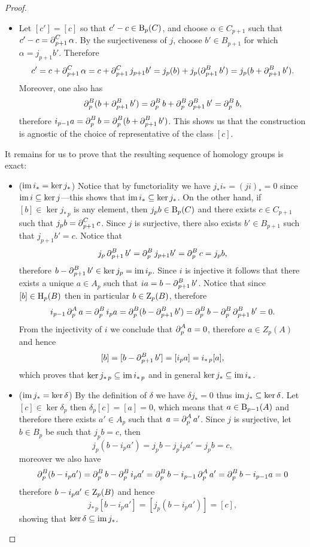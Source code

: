 \begin{proof}
\begin{itemize}
\item Let \([c'] = [c]\) so that \(c' - c \in \operatorname{B}_p(C)\), and choose
  \(\alpha \in C_{p+1}\) such that \(c' - c = \operatorname{\partial}_{p+1}^C \alpha\). By the surjectiveness
  of \(j\), choose \(b' \in B_{p+1}\) for which \(\alpha = j_{p+1} b'\). Therefore
  \[
  c' = c + \operatorname{\partial}_{p+1}^C \alpha = c + \operatorname{\partial}_{p+1}^C j_{p+1} b'
  = j_p(b) + j_p(\operatorname{\partial}_{p+1}^B b')
  = j_p(b + \operatorname{\partial}_{p+1}^B b').
  \]
  Moreover, one also has
  \[
  \operatorname{\partial}_p^B(b + \operatorname{\partial}_{p+1}^B b')
  = \operatorname{\partial}_p^B b + \operatorname{\partial}_p^B \operatorname{\partial}_{p+1}^B b'
  = \operatorname{\partial}_p^{B} b,
  \]
  therefore \(i_{p-1} a = \operatorname{\partial}_p^B b = \operatorname{\partial}_p^B(b + \operatorname{\partial}_{p+1}^B b')\).  This
  shows us that the construction is agnostic of the choice of representative of
  the class \([c]\).
\end{itemize}
It remains for us to prove that the resulting sequence of homology groups is
exact:
\begin{itemize}\setlength\itemsep{0em}
\item (\(\operatorname{im} i_{*} = \ker j_{*}\)) Notice that by functoriality we have
  \(j_{*} i_{*} = (j i)_{*} = 0\) since \(\operatorname{im} i \subseteq \ker j\)---this shows that
  \(\operatorname{im} i_{*} \subseteq \ker j_{*}\). On the other hand, if
  \([b] \in \ker j_{*\, p}\) is any element, then \(j_p b \in \operatorname{B}_p(C)\) and there
  exists \(c \in C_{p+1}\) such that \(j_p b = \operatorname{\partial}_{p+1}^C c\). Since \(j\) is
  surjective, there also exists \(b' \in B_{p+1}\) such that \(j_{p+1} b' =
  c\). Notice that
  \[
  j_p\operatorname{\partial}_{p+1}^B b' = \operatorname{\partial}_p^B j_{p+1} b' = \operatorname{\partial}_p^B c = j_p b,
  \]
  therefore \(b - \operatorname{\partial}_{p+1}^B b' \in \ker j_p = \operatorname{im} i_p\). Since \(i\) is
  injective it follows that there exists a unique \(a \in A_p\) such that
  \(i a = b - \operatorname{\partial}_{p+1}^B b'\). Notice that since \([b] \in \operatorname{H}_p(B)\) then in
  particular \(b \in \operatorname{Z}_p(B)\), therefore
  \[
  i_{p-1} \operatorname{\partial}_p^A a
  = \operatorname{\partial}_p^B i_p a
  =  \operatorname{\partial}_p^B(b - \operatorname{\partial}_{p+1}^B b')
  = \operatorname{\partial}_p^B b - \operatorname{\partial}_p^B \operatorname{\partial}_{p+1}^B b'
  = 0.
  \]
  From the injectivity of \(i\) we conclude that \(\operatorname{\partial}_p^A a = 0\), therefore
  \(a \in Z_p(A)\) and hence
  \[
  [b] = [b - \operatorname{\partial}_{p+1}^B b'] = [i_p a] = i_{*\, p}[a],
  \]
  which proves that \(\ker j_{*\, p} \subseteq \operatorname{im} i_{*\, p}\) and in general
  \(\ker j_{*} \subseteq \operatorname{im} i_{*}\).

\item (\(\operatorname{im} j_{*} = \ker \delta\)) By the definition of \(\delta\) we have
  \(\delta j_{*} = 0\) thus \(\operatorname{im} j_{*} \subseteq \ker \delta\). Let
  \([c] \in \ker \delta_p\) then \(\delta_p[c] = [a] = 0\), which means that
  \(a \in \operatorname{B}_{p-1}(A)\) and therefore there exists \(a' \in A_p\) such that
  \(a = \operatorname{\partial}_p^A a'\). Since \(j\) is surjective, let \(b \in B_p\) be such that
  \(j_p b = c\), then
  \[
  j_p(b - i_p a') = j_p b - j_p i_p a' = j_p b = c,
  \]
  moreover we also have
  \[
  \operatorname{\partial}_p^B(b - i_p a')
  = \operatorname{\partial}_p^B b - \operatorname{\partial}_p^B i_p a'
  = \operatorname{\partial}_p^B b - i_{p-1} \operatorname{\partial}_p^A a'
  = \operatorname{\partial}_p^B b - i_{p-1} a
  = 0
  \]
  therefore \(b - i_p a' \in \operatorname{Z}_p(B)\) and hence
  \[
  j_{*\, p}[b - i_p a'] = [j_p(b - i_p a')] = [c],
  \]
  showing that \(\ker \delta \subseteq \operatorname{im} j_{*}\).


\end{itemize}
\end{proof}
